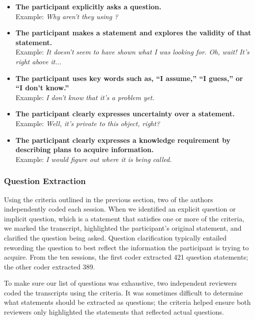 \documentclass{acm_proc_article-sp}
\newcommand{\compresslist}{
	\vspace{-1em}
	\setlength{\itemsep}{1pt}
	\setlength{\parskip}{0pt}
	\setlength{\parsep}{0pt}
}
\begin{document}
\begin{itemize}
\compresslist	
\item \textbf{The participant explicitly asks a question.}
\\ Example: \textit{Why aren't they using ?}
\item \textbf{The participant makes a statement and explores the validity of that statement.}
\\ Example: \textit{It doesn't seem to have shown what I was looking for. Oh, wait! It's right above it...}
\item \textbf{The participant uses key words such as, ``I assume,'' ``I guess,'' or ``I don't know.''}
\\ Example: \textit{I don't know that it's a problem yet.}
\item \textbf{The participant clearly expresses uncertainty over a statement.}
\\ Example: \textit{Well, it's private to this object, right?}
\item \textbf{The participant clearly expresses a knowledge requirement by describing plans to acquire information.}
\\ Example: \textit{I would figure out where it is being called.}

\end{itemize}

\subsubsection{Question Extraction}
Using the criteria outlined in the previous section, two of the authors independently coded each session. 
When we identified an explicit question or implicit question, which is a statement that satisfies one or more of the criteria, we marked the transcript, highlighted the participant's original statement, and clarified the question being asked.
Question clarification typically entailed rewording the question to best reflect the information the participant is trying to acquire.
From the ten sessions, the first coder extracted 421 question statements; the other coder extracted 389. 

To make sure our list of questions was exhaustive, two independent reviewers coded the transcripts using the criteria.
It was sometimes difficult to determine what statements should be extracted as questions; the criteria helped ensure both reviewers only highlighted the statements that reflected actual questions. 
\end{document}
